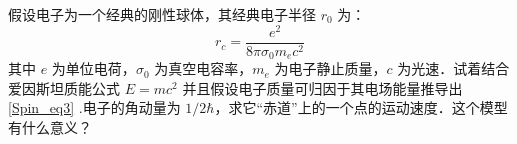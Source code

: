 
\begin{exercise}{}
假设电子为一个经典的刚性球体，其经典电子半径 $r_0$ 为：
\begin{equation}\label{Spin_eq3}
r_c=\frac{e^2}{8\pi\sigma_0m_e c^2}
\end{equation}
其中 $e$ 为单位电荷，$\sigma_0$ 为真空电容率，$m_e$ 为电子静止质量，$c$ 为光速．试着结合爱因斯坦质能公式 $E=mc^2$ 并且假设电子质量可归因于其电场能量推导出\autoref{Spin_eq3} .电子的角动量为 $1/2\hbar$，求它“赤道”上的一个点的运动速度．这个模型有什么意义？
\end{exercise}